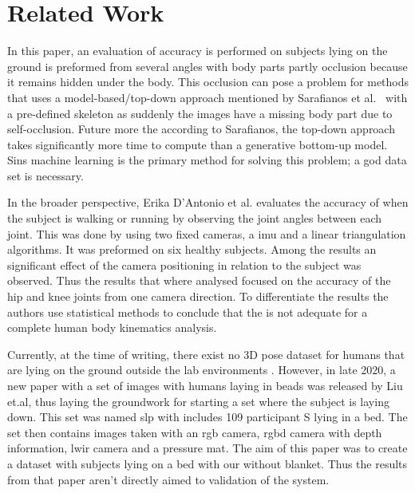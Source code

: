 \section{Related Work}
\label{sec:related_work}
In this paper, an evaluation of accuracy is performed on subjects lying on the ground is preformed from several angles with body parts partly occlusion because it remains hidden under the body.
This occlusion can pose a problem for methods that uses a model-based/top-down approach mentioned by Sarafianos et al.~\cite{sarafianos2016} with a pre-defined skeleton as suddenly the images have a missing body part due to self-occlusion.
Future more the according to Sarafianos, the top-down approach takes significantly more time to compute than a generative bottom-up model.
Sins machine learning is the primary method for solving this problem; a god data set is necessary.

In the broader perspective, Erika D’Antonio et al. \cite{d2021validation} evaluates the accuracy of \openpose{ } when the subject is walking or running by observing the joint angles between each joint.
This was done by using two fixed cameras, a \ac{imu} and a linear triangulation algorithms. It was preformed on six healthy subjects.
Among the results an significant effect of the camera positioning in relation to the subject was observed.
Thus the results that where analysed focused on the accuracy of the hip and knee joints from one camera direction.
To differentiate the results the authors use statistical methods to conclude that the \operpose{ } is not adequate for a complete human body kinematics analysis.

Currently, at the time of writing, there exist no 3D pose dataset for humans that are lying on the ground outside the lab environments \cite{yang2018, mehta2017, yasin2016, wang2019}.
However, in late 2020, a new paper with a set of images with humans laying in beads was released by Liu et.al\cite{liu2020simultaneously}, thus laying the groundwork for starting a set where the subject is laying down.
This set was named \ac{slp} with includes 109 participant S lying in a bed.
The set then contains images taken with an \ac{rgb} camera, \ac{rgbd} camera with depth information, \ac{lwir} camera and a pressure mat.
The aim of this paper was to create a dataset with subjects lying on a bed with our without blanket.
Thus the results from that paper aren't directly aimed to validation of the system.

